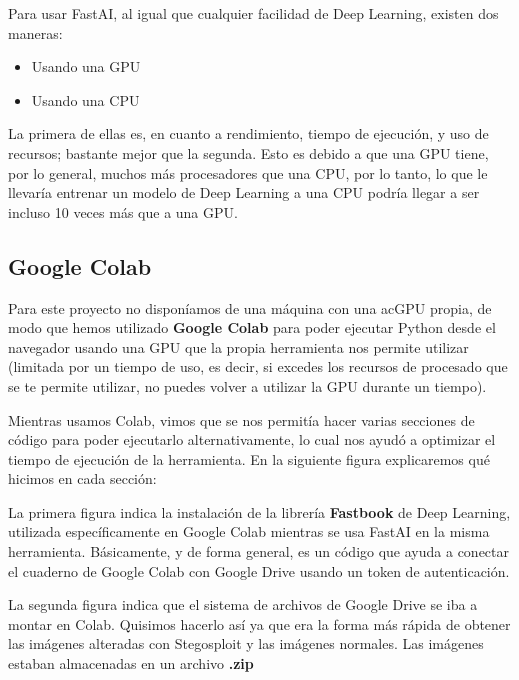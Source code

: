 Para usar FastAI, al igual que cualquier facilidad de Deep Learning, existen dos maneras:

\begin{itemize}
\item Usando una \ac{GPU}
\item Usando una \ac{CPU}
\end{itemize}

La primera de ellas es, en cuanto a rendimiento, tiempo de ejecución, y uso de recursos; bastante mejor que la segunda. Esto es debido a que una \ac{GPU} tiene, por lo general, muchos más procesadores que una \ac{CPU}, por lo tanto, lo que le llevaría entrenar un modelo de Deep Learning a una \ac{CPU} podría llegar a ser incluso 10 veces más que a una \ac{GPU}. %

\subsection{Google Colab}

Para este proyecto no disponíamos de una máquina con una ac{GPU} propia, de modo que hemos utilizado \textbf{Google Colab} para poder ejecutar Python desde el navegador usando una \ac{GPU} que la propia herramienta nos permite utilizar (limitada por un tiempo de uso, es decir, si excedes los recursos de procesado que se te permite utilizar, no puedes volver a utilizar la \ac{GPU} durante un tiempo). %

Mientras usamos Colab, vimos que se nos permitía hacer varias secciones de código para poder ejecutarlo alternativamente, lo cual nos ayudó a optimizar el tiempo de ejecución de la herramienta. En la siguiente figura explicaremos qué hicimos en cada sección:


La primera figura indica la instalación de la librería \textbf{Fastbook} de Deep Learning, utilizada específicamente en Google Colab mientras se usa FastAI en la misma herramienta. Básicamente, y de forma general, es un código que ayuda a conectar el cuaderno de Google Colab con Google Drive usando un token de autenticación. %


La segunda figura indica que el sistema de archivos de Google Drive se iba a montar en Colab. Quisimos hacerlo así ya que era la forma más rápida de obtener las imágenes alteradas con Stegosploit y las imágenes normales. Las imágenes estaban almacenadas en un archivo \textbf{.zip}


